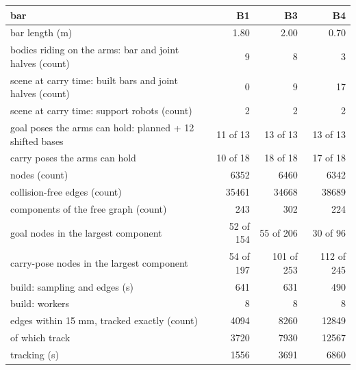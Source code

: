 \begin{tabular}{@{}>{\raggedright\arraybackslash}p{7.4cm} rrr@{}}
\toprule
bar & B1 & B3 & B4 \\
\midrule
bar length (m) & 1.80 & 2.00 & 0.70 \\
bodies riding on the arms: bar and joint halves (count) & 9 & 8 & 3 \\
scene at carry time: built bars and joint halves (count) & 0 & 9 & 17 \\
scene at carry time: support robots (count) & 2 & 2 & 2 \\
\midrule
goal poses the arms can hold: planned + 12 shifted bases & 11 of 13 & 13 of 13 & 13 of 13 \\
carry poses the arms can hold & 10 of 18 & 18 of 18 & 17 of 18 \\
nodes (count) & 6352 & 6460 & 6342 \\
collision-free edges (count) & 35461 & 34668 & 38689 \\
components of the free graph (count) & 243 & 302 & 224 \\
goal nodes in the largest component & 52 of 154 & 55 of 206 & 30 of 96 \\
carry-pose nodes in the largest component & 54 of 197 & 101 of 253 & 112 of 245 \\
\midrule
build: sampling and edges (s) & 641 & 631 & 490 \\
build: workers & 8 & 8 & 8 \\
edges within 15 mm, tracked exactly (count) & 4094 & 8260 & 12849 \\
\quad of which track & 3720 & 7930 & 12567 \\
tracking (s) & 1556 & 3691 & 6860 \\
\bottomrule
\end{tabular}
